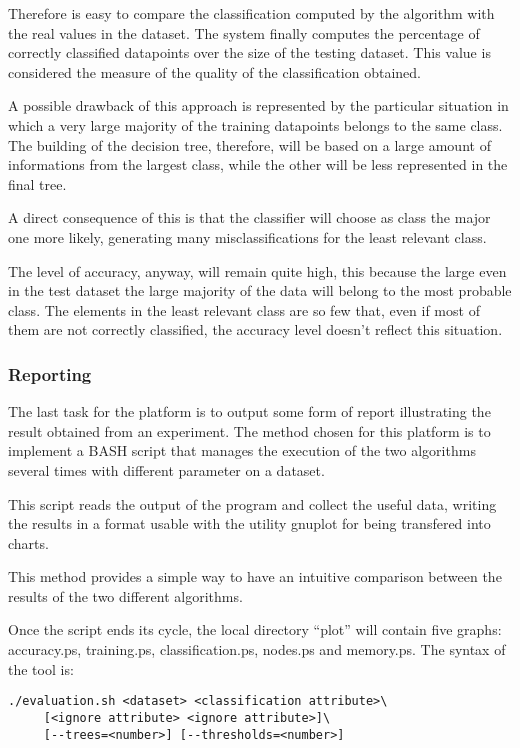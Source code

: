 \documentclass{acm_proc_article-sp-sigmod07}
\begin{document}
Therefore is easy to compare the classification computed by the algorithm
with the real values in the dataset.
The system finally computes the percentage of correctly classified
datapoints over the size of the testing dataset.
This value is considered the measure of the quality of the classification
obtained.

A possible drawback of this approach is represented by the particular
situation in which a very large majority of the training datapoints
belongs to the same class.
The building of the decision tree, therefore, will be based on a large
amount of informations from the largest class, while the other will be
less represented in the final tree.

A direct consequence of this is that the classifier will choose as class
the major one more likely, generating many misclassifications for the
least relevant class.

The level of accuracy, anyway, will remain quite high, this because the
large even in the test dataset the large majority of the data will belong
to the most probable class. The elements in the least relevant class are
so few that, even if most of them are not correctly classified, the
accuracy level doesn't reflect this situation.

\subsubsection{Reporting}
The last task for the platform is to output some form of report
illustrating the result obtained from an experiment.
The method chosen for this platform is to implement a BASH script that
manages the execution of the two algorithms several times with different
parameter on a dataset.

This script reads the output of the program and collect the useful data,
writing the results in a format usable with the utility gnuplot for being
transfered into charts.

This method provides a simple way to have an intuitive comparison between the
results of the two different algorithms.

Once the script ends its cycle, the local directory ``plot'' will contain
five graphs: accuracy.ps, training.ps, classification.ps, nodes.ps and
memory.ps. The syntax of the tool is:
\begin{verbatim}
./evaluation.sh <dataset> <classification attribute>\
     [<ignore attribute> <ignore attribute>]\
     [--trees=<number>] [--thresholds=<number>]
\end{verbatim}
\end{document}
